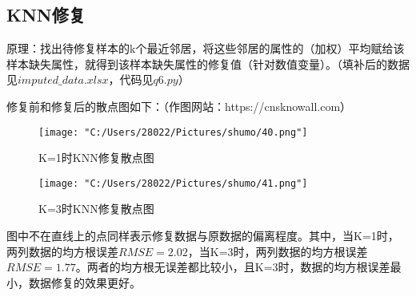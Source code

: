 \documentclass[withoutpreface,bwprint]{cumcmthesis} %
\begin{document}
        \subsection{KNN修复}
        原理：找出待修复样本的k个最近邻居，将这些邻居的属性的（加权）平均赋给该样本缺失属性，就得到该样本缺失属性的修复值（针对数值变量）。（填补后的数据见$imputed\_data.xlsx$，代码见$q6.py$）\par
        修复前和修复后的散点图如下：（作图网站：https://cnsknowall.com）\newpage
        \begin{figure}[!htbp]
            \centering
            \begin{minipage}{0.49\textwidth}
                \centering
                \texttt{[image: "C:/Users/28022/Pictures/shumo/40.png"]}
                \caption{K=1时KNN修复散点图}
            \end{minipage}
            \hfill %
            \begin{minipage}{0.49\textwidth}
                \centering
                \texttt{[image: "C:/Users/28022/Pictures/shumo/41.png"]}
                \caption{K=3时KNN修复散点图}
            \end{minipage}
        \end{figure}\par
        图中不在直线上的点同样表示修复数据与原数据的偏离程度。其中，当K=1时，两列数据的均方根误差$RMSE=2.02$，当K=3时，两列数据的均方根误差$RMSE=1.77$。两者的均方根无误差都比较小，且K=3时，数据的均方根误差最小，数据修复的效果更好。















    

    




    

    
\end{document}
